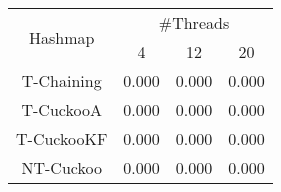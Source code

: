 \begin{tabular}{|c|c|c|c|}
\hline
\multirow{2}{*}{Hashmap} & \multicolumn{3}{c|}{\#Threads}\\\cline{2-4}& 4 & 12 & 20\\
\hline
\hline
T-Chaining & 0.000 & 0.000 & 0.000\\
T-CuckooA & 0.000 & 0.000 & 0.000\\
T-CuckooKF & 0.000 & 0.000 & 0.000\\
NT-Cuckoo & 0.000 & 0.000 & 0.000\\
\hline
\end{tabular}
